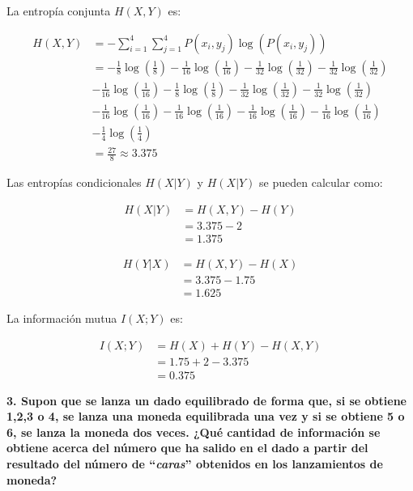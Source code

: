 \documentclass{article}
\begin{document}
La entropía conjunta $H(X,Y)$ es:

\begin{align*}
    H(X,Y) &= -\sum_{i=1}^{4}\sum_{j=1}^{4}P(x_i,y_j)\log\left(P(x_i,y_j)\right)\\
    &= -\frac{1}{8}\log\left(\frac{1}{8}\right) - \frac{1}{16}\log\left(\frac{1}{16}\right) - \frac{1}{32}\log\left(\frac{1}{32}\right) - \frac{1}{32}\log\left(\frac{1}{32}\right)\\
    &- \frac{1}{16}\log\left(\frac{1}{16}\right) - \frac{1}{8}\log\left(\frac{1}{8}\right) - \frac{1}{32}\log\left(\frac{1}{32}\right) - \frac{1}{32}\log\left(\frac{1}{32}\right)\\
    &- \frac{1}{16}\log\left(\frac{1}{16}\right) - \frac{1}{16}\log\left(\frac{1}{16}\right) - \frac{1}{16}\log\left(\frac{1}{16}\right) - \frac{1}{16}\log\left(\frac{1}{16}\right)\\
    &- \frac{1}{4}\log\left(\frac{1}{4}\right)\\
    &= \frac{27}{8}\approx 3.375
\end{align*}

Las entropías condicionales $H(X|Y)$ y $H(X|Y)$ se pueden calcular como:

\begin{align*}
    H(X|Y) &= H(X,Y) - H(Y)\\
    &= 3.375 - 2\\
    &= 1.375
\end{align*}

\begin{align*}
    H(Y|X) &= H(X,Y) - H(X)\\
    &= 3.375 - 1.75\\
    &= 1.625
\end{align*}

La información mutua $I(X;Y)$ es:

\begin{align*}
    I(X;Y) &= H(X) + H(Y) - H(X,Y)\\
    &= 1.75 + 2 - 3.375\\
    &= 0.375
\end{align*}

\vspace{1cm}

\textbf{
3. Supon que se lanza un dado equilibrado de forma que, si se obtiene 1,2,3 o 4, se lanza una moneda equilibrada una vez y si se obtiene 5 o 6, se lanza la moneda dos veces. ¿Qué cantidad de información se obtiene acerca del número que ha salido en el dado a partir del resultado del número de ``\textit{caras}'' obtenidos en los lanzamientos de moneda?
}
\end{document}
